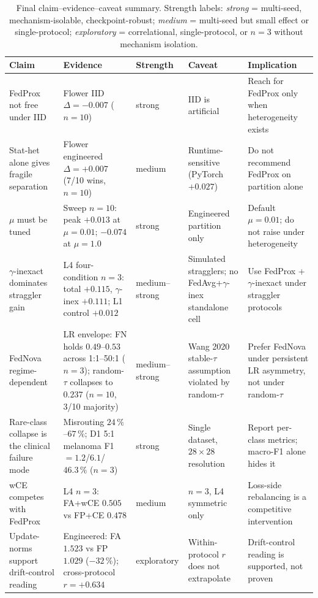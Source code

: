 \documentclass[11pt,a4paper]{report}
\begin{document}
\begin{table}[h]
\centering
\small
\caption{Final claim--evidence--caveat summary. Strength labels: \emph{strong}
= multi-seed, mechanism-isolable, checkpoint-robust; \emph{medium} =
multi-seed but small effect or single-protocol; \emph{exploratory} =
correlational, single-protocol, or $n=3$ without mechanism isolation.}
\label{tab:final-claims}
\begin{tabular}{p{3.0cm}p{3.6cm}p{1.6cm}p{2.6cm}p{2.6cm}}
\hline
Claim & Evidence & Strength & Caveat & Implication \\
\hline
FedProx not free under IID & Flower IID $\Delta = -0.007$ ($n=10$) & strong & IID is artificial & Reach for FedProx only when heterogeneity exists \\
Stat-het alone gives fragile separation & Flower engineered $\Delta = +0.007$ (7/10 wins, $n=10$) & medium & Runtime-sensitive (PyTorch $+0.027$) & Do not recommend FedProx on partition alone \\
$\mu$ must be tuned & Sweep $n=10$: peak $+0.013$ at $\mu = 0.01$; $-0.074$ at $\mu = 1.0$ & strong & Engineered partition only & Default $\mu = 0.01$; do not raise under heterogeneity \\
$\gamma$-inexact dominates straggler gain & L4 four-condition $n=3$: total $+0.115$, $\gamma$-inex $+0.111$; L1 control $+0.012$ & medium--strong & Simulated stragglers; no FedAvg+$\gamma$-inex standalone cell & Use FedProx + $\gamma$-inexact under straggler protocols \\
FedNova regime-dependent & LR envelope: FN holds $0.49$--$0.53$ across 1:1--50:1 ($n=3$); random-$\tau$ collapses to $0.237$ ($n=10$, 3/10 majority) & medium--strong & Wang 2020 stable-$\tau$ assumption violated by random-$\tau$ & Prefer FedNova under persistent LR asymmetry, not under random-$\tau$ \\
Rare-class collapse is the clinical failure mode & Misrouting $24\,\%$--$67\,\%$; D1 5:1 melanoma F1 $= 1.2$/$6.1$/$46.3\,\%$ ($n=3$) & strong & Single dataset, $28 \times 28$ resolution & Report per-class metrics; macro-F1 alone hides it \\
wCE competes with FedProx & L4 $n=3$: FA+wCE $0.505$ vs FP+CE $0.478$ & medium & $n=3$, L4 symmetric only & Loss-side rebalancing is a competitive intervention \\
Update-norms support drift-control reading & Engineered: FA $1.523$ vs FP $1.029$ ($-32\,\%$); cross-protocol $r = +0.634$ & exploratory & Within-protocol $r$ does not extrapolate & Drift-control reading is supported, not proven \\
\hline
\end{tabular}
\end{table}
\end{document}
